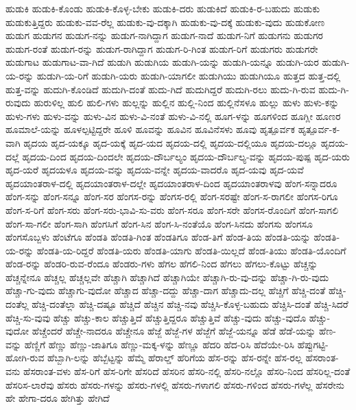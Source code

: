 {ಹುಡುಕಿ
ಹುಡುಕಿ-ಕೊಂಡು
ಹುಡುಕಿ-ಕೊಳ್ಳ-ಬೇಕು
ಹುಡುಕಿ-ದರು
ಹುಡುಕಿದೆ
ಹುಡುಕಿ-ರ-ಬಹುದು
ಹುಡುಕು
ಹುಡುಕುತ್ತಿದ್ದರು
ಹುಡುಕು-ವವ-ರೆಲ್ಲ
ಹುಡುಕು-ವು-ದಕ್ಕಾಗಿ
ಹುಡುಕು-ವು-ದಕ್ಕೆ
ಹುಡುಕು-ವುದು
ಹುಡುಕೋಣ
ಹುಡುಗ
ಹುಡುಗನ
ಹುಡುಗ-ನನ್ನು
ಹುಡುಗ-ನಾಗಿದ್ದಾಗ
ಹುಡುಗ-ನಾದೆ
ಹುಡುಗ-ನಿಗೆ
ಹುಡುಗನು
ಹುಡುಗರ
ಹುಡುಗ-ರಂತೆ
ಹುಡುಗ-ರನ್ನು
ಹುಡುಗ-ರಾಗಿದ್ದಾಗ
ಹುಡುಗ-ರಿ-ಗಿಂತ
ಹುಡುಗ-ರಿಗೆ
ಹುಡುಗರು
ಹುಡುಗರೇ
ಹುಡುಗಾಟ
ಹುಡುಗಾಟ-ವಾ-ಗಿದೆ
ಹುಡುಗಿ
ಹುಡುಗಿಯ
ಹುಡುಗಿ-ಯನ್ನು
ಹುಡುಗಿ-ಯನ್ನೂ
ಹುಡುಗಿ-ಯರ
ಹುಡುಗಿ-ಯ-ರನ್ನು
ಹುಡುಗಿ-ಯ-ರಿಗೆ
ಹುಡುಗಿ-ಯರು
ಹುಡುಗಿ-ಯಾಗಲೀ
ಹುಡುಗಿಯು
ಹುಡುಗಿಯೂ
ಹುತ್ತದ
ಹುತ್ತ-ದಲ್ಲಿ
ಹುತ್ತ-ವನ್ನು
ಹುದುಗಿ-ಕೊಂಡಿದೆ
ಹುದುಗಿ-ದಂತೆ
ಹುದು-ಗಿದೆ
ಹುದುಗಿದ್ದರೆ
ಹುದುಗಿ-ರಲು
ಹುದು-ಗಿ-ರುವ
ಹುದು-ಗಿ-ರುವುದು
ಹುರುಳಿಲ್ಲ
ಹುಲಿ
ಹುಲಿ-ಗಳು
ಹುಲ್ಲನ್ನು
ಹುಲ್ಲಿನ
ಹುಲ್ಲಿ-ನಿಂದ
ಹುಲ್ಲಿನೆಸಳೂ
ಹುಲ್ಲು
ಹುಳು
ಹುಳು-ಕನ್ನು
ಹುಳು-ಗಳು
ಹುಳು-ವನ್ನು
ಹುಳು-ವಿನ
ಹುಳು-ವಿ-ನಂತೆ
ಹುಳು-ವಿ-ನಲ್ಲಿ
ಹೂಗ-ಳನ್ನು
ಹೂಗಳಿಂದ
ಹೂಗ್ಲೀ
ಹೂಣರ
ಹೂಮಾಲೆ-ಯನ್ನು
ಹೂಳಲ್ಪಟ್ಟಿದ್ದರೇ
ಹೂಳಿ
ಹೂವನ್ನು
ಹೂವಿನ
ಹೂವಿನೆಸಳು
ಹೂವು
ಹೃತ್ಪೂರ್ವಕ
ಹೃತ್ಪೂರ್ವ-ಕ-ವಾಗಿ
ಹೃದಯ
ಹೃದ-ಯಕ್ಕೂ
ಹೃದ-ಯಕ್ಕೆ
ಹೃದ-ಯದ
ಹೃದಯ-ದಲ್ಲಿ
ಹೃದಯ-ದಲ್ಲಿಯೂ
ಹೃದಯ-ದಲ್ಲೂ
ಹೃದಯ-ದಲ್ಲೆ
ಹೃದಯ-ದಿಂದ
ಹೃದಯ-ದಿಂದಲೇ
ಹೃದಯ-ದೌರ್ಬಲ್ಯಂ
ಹೃದಯ-ದೌರ್ಬಲ್ಯ-ವನ್ನು
ಹೃದಯ-ಪುಷ್ಪ
ಹೃದ-ಯರು
ಹೃದ-ಯರೆ
ಹೃದಯಳೂ
ಹೃದಯ-ವನ್ನು
ಹೃದಯ-ವನ್ನೇ
ಹೃದಯ-ವಾದರೊ
ಹೃದ-ಯವು
ಹೃದ-ಯವೆ
ಹೃದಯಾಂತರಾಳ-ದಲ್ಲಿ
ಹೃದಯಾಂತರಾಳ-ದಲ್ಲೇ
ಹೃದಯಾಂತರಾಳ-ದಿಂದ
ಹೃದಯಾಂತರಾಳವು
ಹೆಂಗ-ಸನ್ನಾದರೂ
ಹೆಂಗ-ಸನ್ನು
ಹೆಂಗ-ಸನ್ನೂ
ಹೆಂಗ-ಸರ
ಹೆಂಗಸ-ರನ್ನು
ಹೆಂಗಸ-ರಲ್ಲಿ
ಹೆಂಗ-ಸರಷ್ಟೇ
ಹೆಂಗ-ಸ-ರಾಗಲೀ
ಹೆಂಗಸ-ರಿಗೂ
ಹೆಂಗ-ಸ-ರಿಗೆ
ಹೆಂಗ-ಸರು
ಹೆಂಗ-ಸರು-ಭಾವಿ-ಸು-ವರು
ಹೆಂಗ-ಸರೂ
ಹೆಂಗ-ಸರೇ
ಹೆಂಗಸ-ರೊಂದಿಗೆ
ಹೆಂಗ-ಸಾಗಲಿ
ಹೆಂಗ-ಸಾ-ಗಲೀ
ಹೆಂಗ-ಸಾಗಿ
ಹೆಂಗಸಿಗೆ
ಹೆಂಗ-ಸಿನ
ಹೆಂಗ-ಸಿ-ನಂತೆಯೊ
ಹೆಂಗ-ಸಿನದು
ಹೆಂಗಸು
ಹೆಂಗಸೂ
ಹೆಂಗಸೊಬ್ಬಳು
ಹೆಂಟೆಗೂ
ಹೆಂಡತಿ
ಹೆಂಡತಿ-ಗಿಂತ
ಹೆಂಡತಿಗೂ
ಹೆಂಡ-ತಿಗೆ
ಹೆಂಡ-ತಿಯ
ಹೆಂಡತಿ-ಯನ್ನು
ಹೆಂಡತಿ-ಯ-ರನ್ನು
ಹೆಂಡತಿ-ಯ-ರಿದ್ದರೆ
ಹೆಂಡತಿ-ಯರು
ಹೆಂಡತಿ-ಯಾಗು
ಹೆಂಡತಿ-ಯಿಲ್ಲದೆ
ಹೆಂಡ-ತಿಯು
ಹೆಂಡತಿ-ಯೊಂದಿಗೆ
ಹೆಂಡ-ರನ್ನು
ಹೆಂಡರಿ-ರುವ-ರೆಂದೂ
ಹೆಂಡರು-ಗಳು
ಹೆಗಲ
ಹೆಗಲಿ-ನಿಂದ
ಹೆಗಲು
ಹೆಗಲು-ಕೊಟ್ಟು
ಹೆಚ್ಚನ್ನು
ಹೆಚ್ಚನ್ನೇನೂ
ಹೆಚ್ಚಲ್ಲ
ಹೆಚ್ಚಲ್ಲವೇ
ಹೆಚ್ಚಾಗಿ
ಹೆಚ್ಚಾಗಿದೆ
ಹೆಚ್ಚಾಗಿಯೇ
ಹೆಚ್ಚಾಗಿ-ರು-ವು-ದನ್ನು
ಹೆಚ್ಚಾ-ಗಿ-ರು-ವುದು
ಹೆಚ್ಚಾ-ಗು-ವುದು
ಹೆಚ್ಚಾಗು-ವುದೋ
ಹೆಚ್ಚಾದ
ಹೆಚ್ಚಾ-ದದ್ದು
ಹೆಚ್ಚಾ-ದಾಗ
ಹೆಚ್ಚಾದು-ದಲ್ಲ
ಹೆಚ್ಚಿಗೆ
ಹೆಚ್ಚಿ-ದಂತೆ
ಹೆಚ್ಚಿ-ದಂತೆಲ್ಲ
ಹೆಚ್ಚಿ-ದಂತೆಲ್ಲಾ
ಹೆಚ್ಚಿ-ದಷ್ಟೂ
ಹೆಚ್ಚಿದೆ
ಹೆಚ್ಚಿನ
ಹೆಚ್ಚಿ-ನವು
ಹೆಚ್ಚಿಸಿ-ಕೊಳ್ಳ-ಬಹುದು
ಹೆಚ್ಚಿಸಿ-ದಂತೆ
ಹೆಚ್ಚಿ-ಸಿದರೆ
ಹೆಚ್ಚಿ-ಸು-ವುವು
ಹೆಚ್ಚು
ಹೆಚ್ಚು-ಕಾಲ
ಹೆಚ್ಚುತ್ತಿದೆ
ಹೆಚ್ಚುತ್ತಿದ್ದರೂ
ಹೆಚ್ಚುತ್ತಿವೆ
ಹೆಚ್ಚು-ವುದು
ಹೆಚ್ಚು-ವುದೊ
ಹೆಚ್ಚು-ವುದೋ
ಹೆಚ್ಚೆಂದರೆ
ಹೆಚ್ಚೇ-ನಾದರೂ
ಹೆಚ್ಚೇನೂ
ಹೆಜ್ಜೆ
ಹೆಜ್ಜೆ-ಗಳ
ಹೆಜ್ಜೆಗೆ
ಹೆಜ್ಜೆ-ಯನ್ನೂ
ಹೆಡೆ
ಹೆಡೆ-ಯನ್ನು
ಹೆಣ-ವನ್ನು
ಹೆಣ್ಣಿಗೆ
ಹೆಣ್ಣು
ಹೆಣ್ಣು-ಜಾತಿಗೂ
ಹೆಣ್ಣು-ಮಕ್ಕ-ಳನ್ನು
ಹೆಣ್ಣೂ
ಹೆದರಿ
ಹೆದ-ರಿಸಿ
ಹೆದೆಯೇ-ರಿಸಿ
ಹೆಪ್ಪುಗಟ್ಟಿ-ಹೋಗಿ-ರುವ
ಹೆಬ್ಬಾಗಿ-ಲನ್ನು
ಹೆಬ್ಬೆಟ್ಟನ್ನು
ಹೆಮ್ಮೆ
ಹೆರಾಲ್ಡ್
ಹೆರಿಗೆಯ
ಹೆಸ-ರನ್ನು
ಹೆಸ-ರನ್ನೇ
ಹೆಸ-ರಲ್ಲ
ಹೆಸರಾಂತ-ವನು
ಹೆಸರಾಂತ-ವಳು
ಹೆಸ-ರಿಗೆ
ಹೆಸ-ರಿಗೇ
ಹೆಸರಿದೆ
ಹೆಸರಿನ
ಹೆಸರಿ-ನಲ್ಲಿ
ಹೆಸರಿ-ನಲ್ಲೊ
ಹೆಸರಿ-ನಿಂದ
ಹೆಸರಿಲ್ಲ-ದಂತೆ
ಹೆಸರಿಸ-ಲಾರೆವು
ಹೆಸರು
ಹೆಸರು-ಗಳನ್ನು
ಹೆಸರು-ಗಳಲ್ಲಿ
ಹೆಸರು-ಗಳಾಗಲಿ
ಹೆಸರು-ಗಳಿಂದ
ಹೆಸರು-ಗಳೆಲ್ಲ
ಹೆಸರೇನು
ಹೇ
ಹೇಗಾ-ದರೂ
ಹೇಗಿತ್ತು
ಹೇಗಿದೆ
}
